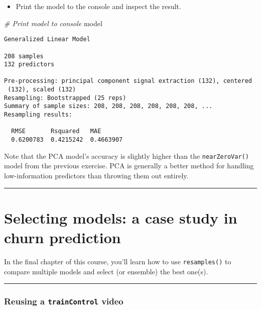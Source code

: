 \documentclass[]{book}
\newenvironment{Shaded}{\begin{snugshade}}{\end{snugshade}}
\newcommand{\CommentTok}[1]{\textcolor[rgb]{0.56,0.35,0.01}{\textit{#1}}}
\newcommand{\NormalTok}[1]{#1}
\providecommand{\tightlist}{%
  \setlength{\itemsep}{0pt}\setlength{\parskip}{0pt}}
\begin{document}
\begin{itemize}
\tightlist
\item
  Print the model to the console and inspect the result.
\end{itemize}

\begin{Shaded}
\begin{Highlighting}[]
\CommentTok{# Print model to console}
\NormalTok{model}
\end{Highlighting}
\end{Shaded}

\begin{verbatim}
Generalized Linear Model 

208 samples
132 predictors

Pre-processing: principal component signal extraction (132), centered
 (132), scaled (132) 
Resampling: Bootstrapped (25 reps) 
Summary of sample sizes: 208, 208, 208, 208, 208, 208, ... 
Resampling results:

  RMSE       Rsquared   MAE      
  0.6200783  0.4215242  0.4663907
\end{verbatim}

Note that the PCA model's accuracy is slightly higher than the
\texttt{nearZeroVar()} model from the previous exercise. PCA is
generally a better method for handling low-information predictors than
throwing them out entirely.

\begin{center}\rule{0.5\linewidth}{\linethickness}\end{center}

\chapter{Selecting models: a case study in churn
prediction}\label{selecting-models-a-case-study-in-churn-prediction}

In the final chapter of this course, you'll learn how to use
\texttt{resamples()} to compare multiple models and select (or ensemble)
the best one(s).

\begin{center}\rule{0.5\linewidth}{\linethickness}\end{center}

\subsection*{\texorpdfstring{Reusing a \texttt{trainControl}
video}{Reusing a trainControl video}}\label{reusing-a-traincontrol-video}
\end{document}
